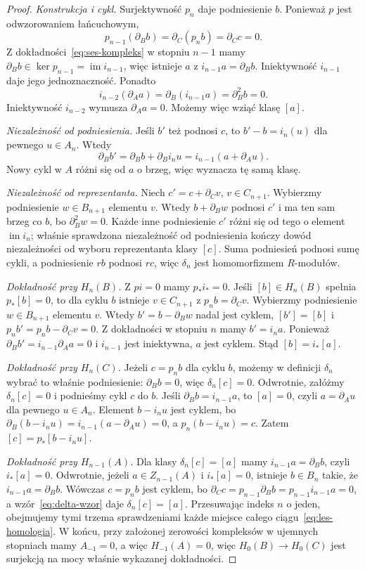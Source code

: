 \begin{proof}
\emph{Konstrukcja i cykl.} Surjektywność $p_n$
daje podniesienie $b$. Ponieważ $p$ jest odwzorowaniem łańcuchowym,
\[
 p_{n-1}(\partial_Bb)=\partial_C(p_nb)=\partial_Cc=0.
\]
Z dokładności~\eqref{eq:ses-kompleks} w
stopniu $n-1$ mamy
$\partial_Bb\in\ker p_{n-1}=\operatorname{im}i_{n-1}$,
więc istnieje $a$ z $i_{n-1}a=\partial_Bb$.
Iniektywność $i_{n-1}$ daje jego jednoznaczność.
Ponadto
\[
 i_{n-2}(\partial_Aa)
 =\partial_B(i_{n-1}a)=\partial_B^2b=0.
\]
Iniektywność $i_{n-2}$ wymusza $\partial_Aa=0$.
Możemy więc wziąć klasę $[a]$.

\emph{Niezależność od podniesienia.} Jeśli $b'$ też
podnosi $c$, to $b'-b=i_n(u)$ dla pewnego
$u\in A_n$. Wtedy
\[
 \partial_Bb'=\partial_Bb+\partial_Bi_nu
 =i_{n-1}(a+\partial_Au).
\]
Nowy cykl w $A$ różni się od $a$ o brzeg,
więc wyznacza tę samą klasę.

\emph{Niezależność od reprezentanta.}
Niech $c'=c+\partial_Cv$, $v\in C_{n+1}$.
Wybierzmy podniesienie $w\in B_{n+1}$ elementu $v$.
Wtedy $b+\partial_Bw$ podnosi $c'$ i ma ten sam
brzeg co $b$, bo $\partial_B^2w=0$.
Każde inne podniesienie $c'$ różni się od tego
o element $\operatorname{im}i_n$; właśnie
sprawdzona niezależność od podniesienia
kończy dowód niezależności od wyboru reprezentanta klasy $[c]$.
Suma podniesień podnosi sumę cykli, a
podniesienie $rb$ podnosi $rc$, więc $\delta_n$
jest homomorfizmem $R$-modułów.

\emph{Dokładność przy $H_n(B)$.}
Z $pi=0$ mamy $p_*i_*=0$.
Jeśli $[b]\in H_n(B)$ spełnia
$p_*[b]=0$, to dla cyklu $b$
istnieje $v\in C_{n+1}$ z
$p_nb=\partial_Cv$. Wybierzmy podniesienie
$w\in B_{n+1}$ elementu $v$.
Wtedy $b'=b-\partial_Bw$ nadal jest cyklem,
$[b']=[b]$ i
$p_nb'=p_nb-\partial_Cv=0$. Z dokładności
w stopniu $n$ mamy $b'=i_na$.
Ponieważ $\partial_Bb'=i_{n-1}\partial_Aa=0$
i $i_{n-1}$ jest iniektywna, $a$ jest
cyklem. Stąd $[b]=i_*[a]$.

\emph{Dokładność przy $H_n(C)$.}
Jeżeli $c=p_nb$ dla cyklu $b$, możemy
w definicji $\delta_n$ wybrać to właśnie
podniesienie: $\partial_Bb=0$, więc $\delta_n[c]=0$.
Odwrotnie, załóżmy $\delta_n[c]=0$
i podnieśmy cykl $c$ do $b$.
Jeśli $\partial_Bb=i_{n-1}a$, to $[a]=0$,
czyli $a=\partial_Au$ dla pewnego $u\in A_n$.
Element $b-i_nu$ jest cyklem, bo
$\partial_B(b-i_nu)=i_{n-1}(a-\partial_Au)=0$,
a $p_n(b-i_nu)=c$. Zatem
$[c]=p_*[b-i_nu]$.

\emph{Dokładność przy $H_{n-1}(A)$.}
Dla klasy $\delta_n[c]=[a]$ mamy
$i_{n-1}a=\partial_Bb$, czyli $i_*[a]=0$.
Odwrotnie, jeżeli $a\in Z_{n-1}(A)$
i $i_*[a]=0$, istnieje $b\in B_n$
takie, że $i_{n-1}a=\partial_Bb$.
Wówczas $c=p_nb$ jest cyklem, bo
$\partial_Cc=p_{n-1}\partial_Bb=p_{n-1}i_{n-1}a=0$,
a wzór~\eqref{eq:delta-wzor} daje
$\delta_n[c]=[a]$.
Przesuwając indeks $n$ o jeden,
obejmujemy tymi trzema sprawdzeniami
każde miejsce całego ciągu~\eqref{eq:les-homologia}.
W końcu, przy założonej zerowości kompleksów w ujemnych
stopniach mamy $A_{-1}=0$, a więc
$H_{-1}(A)=0$, więc $H_0(B)\to H_0(C)$
jest surjekcją na mocy właśnie wykazanej
dokładności.
\end{proof}


